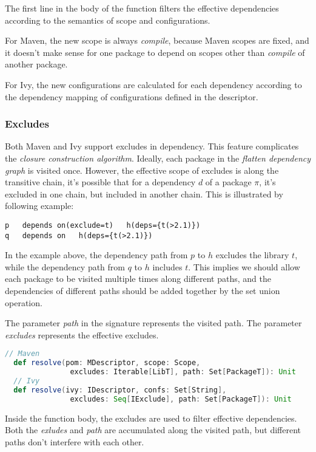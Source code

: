 The first line in the body of the function filters the effective dependencies according to the semantics of scope and configurations.

For Maven, the new scope is always \emph{compile}, because Maven scopes are fixed, and it doesn't make sense for one package to depend on scopes other than \emph{compile} of another package.

For Ivy, the new configurations are calculated for each dependency according to the dependency mapping of configurations defined in the descriptor.

\subsubsection{Excludes}

Both Maven and Ivy support excludes in dependency. This feature complicates the \emph{closure construction algorithm}. Ideally, each package in the \emph{flatten dependency graph} is visited once. However, the effective scope of excludes is along the transitive chain, it's possible that for a dependency $d$ of a package $\pi$, it's excluded in one chain, but included in another chain. This is illustrated by following example:

\begin{verbatim}
p   depends on(exclude=t)   h(deps={t(>2.1)})
q   depends on   h(deps={t(>2.1)})
\end{verbatim}

In the example above, the dependency path from $p$ to $h$ excludes the library $t$, while the dependency path from $q$ to $h$ includes $t$. This implies we should allow each package to be visited multiple times along different paths, and the dependencies of different paths should be added together by the set union operation.

The parameter \emph{path} in the signature represents the visited path. The parameter \emph{excludes} represents the effective excludes.

\begin{lstlisting}[language=Scala]
  // Maven
  def resolve(pom: MDescriptor, scope: Scope,
               excludes: Iterable[LibT], path: Set[PackageT]): Unit
  // Ivy
  def resolve(ivy: IDescriptor, confs: Set[String],
               excludes: Seq[IExclude], path: Set[PackageT]): Unit
\end{lstlisting}

Inside the function body, the excludes are used to filter effective dependencies. Both the \emph{exludes} and \emph{path} are accumulated along the visited path, but different paths don't interfere with each other.

